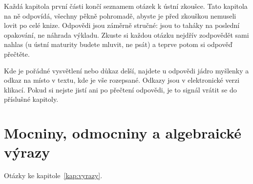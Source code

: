 \label{kap:odpovedi}

\newcommand{\otazka}[1]{\textbf{#1}\par\nopagebreak\smallskip}
\newcommand{\vizsekce}[1]{Podrobně viz sekce~\ref{#1} na straně~\pageref{#1}.}
\newcommand{\vizpriklad}[1]{Podrobně viz příklad~\ref{#1} na straně~\pageref{#1}.}

Každá kapitola první části končí seznamem otázek k ústní zkoušce. Tato kapitola na ně odpovídá, všechny pěkně pohromadě, abyste je před zkouškou nemuseli lovit po celé knize. Odpovědi jsou záměrně stručné: jsou to taháky na poslední opakování, ne náhrada výkladu. Zkuste si každou otázku nejdřív zodpovědět sami nahlas (u ústní maturity budete mluvit, ne psát) a teprve potom si odpověď přečtěte.

Kde je pořádné vysvětlení nebo důkaz delší, najdete u odpovědi jádro myšlenky a odkaz na místo v textu, kde je vše rozepsané. Odkazy jsou v elektronické verzi klikací. Pokud si nejste jistí ani po přečtení odpovědi, je to signál vrátit se do příslušné kapitoly.

\section{Mocniny, odmocniny a algebraické výrazy}

Otázky ke kapitole~\ref{kap:vyrazy}.

